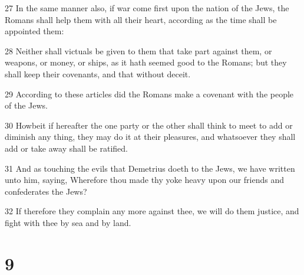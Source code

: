 \par 27 In the same manner also, if war come first upon the nation of the Jews, the Romans shall help them with all their heart, according as the time shall be appointed them:
\par 28 Neither shall victuals be given to them that take part against them, or weapons, or money, or ships, as it hath seemed good to the Romans; but they shall keep their covenants, and that without deceit.
\par 29 According to these articles did the Romans make a covenant with the people of the Jews.
\par 30 Howbeit if hereafter the one party or the other shall think to meet to add or diminish any thing, they may do it at their pleasures, and whatsoever they shall add or take away shall be ratified.
\par 31 And as touching the evils that Demetrius doeth to the Jews, we have written unto him, saying, Wherefore thou made thy yoke heavy upon our friends and confederates the Jews?
\par 32 If therefore they complain any more against thee, we will do them justice, and fight with thee by sea and by land.

\chapter{9}

